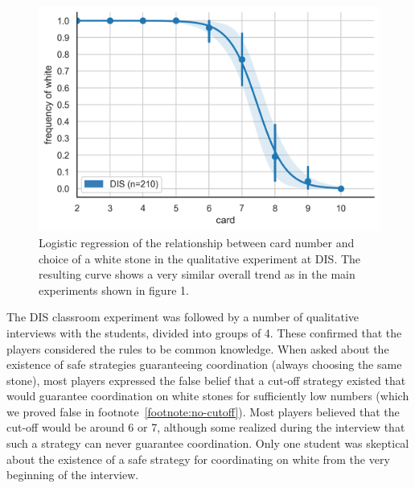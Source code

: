 \documentclass[twocolumn,a4paper,superscriptaddress,nofootinbib]{revtex4}
\begin{document}
\begin{figure} %
  \centering\includegraphics[width=0.6\linewidth]{fig5_DIS.png}
  \caption{Logistic regression of the relationship between card number and choice of a white stone in the qualitative experiment at DIS. The resulting curve shows a very similar overall trend as in the main experiments shown in figure 1.}
  \label{fig:dis}
  \end{figure}  

The DIS classroom experiment was followed by a number of qualitative interviews with the students, divided into groups of 4.  These confirmed that the players considered the rules to be common knowledge. 
When asked about the existence of safe strategies guaranteeing coordination (always choosing the same stone), 
most players expressed the false belief that a cut-off strategy existed that would guarantee coordination on white stones for sufficiently low numbers (which we proved false in footnote~\ref{footnote:no-cutoff}). Most players believed that the cut-off would be around 6 or 7,  
although some realized during the interview that such a  strategy can never guarantee coordination. Only one student was skeptical about the existence of a safe strategy for coordinating on white from the very beginning of the interview. 
\end{document}
